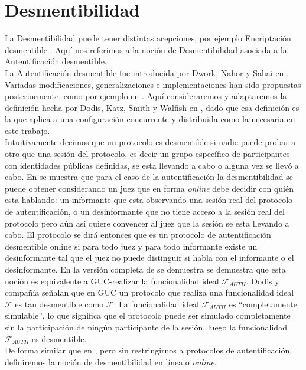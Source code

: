 \chapter{Desmentibilidad}
La Desmentibilidad puede tener distintas acepciones, por ejemplo Encriptación
desmentible \cite{CanettiEtAl97}. Aquí nos referimos a la noción de Desmentibilidad asociada
a la Autentificación desmentible.\\
La Autentificación desmentible fue introducida por Dwork, Nahor y Sahai en \cite{DwoNaoSah04}.
Variadas modificaciones, generalizaciones e implementaciones han sido propuestas posteriormente,
como por ejemplo en \cite{journals/joc/RaimondoG09}. Aquí consideraremos y adaptaremos la definición
hecha por Dodis, Katz, Smith y Walfish en \cite{conf/tcc/DodisKSW09}, dado que esa definición
es la que aplica a una configuración concurrente y distribuida como la necesaria en este trabajo.\\
Intuitivamente decimos que un protocolo es desmentible si nadie puede probar a otro que una sesión
del protocolo, es decir un grupo específico de participantes con identidades públicas definidas,
se esta llevando a cabo o alguna vez se llevó a cabo. En \cite{conf/tcc/DodisKSW09} se muestra que
para el caso de la autentificación la desmentibilidad se puede obtener considerando un juez que
en forma \textit{online} debe decidir con quién esta hablando: un informante que esta observando
una sesión real del protocolo de autentificación, o un desinformante que no tiene acceso a la sesión
real del protocolo pero aún así quiere convencer al juez que la sesión se esta llevando a cabo.
El protocolo se dirá entonces que es un protocolo de autentificación desmentible online si
para todo juez y para todo informante existe un desinformante tal
que el juez no puede distinguir
si habla con el informante o el desinformante. En la versión completa de \cite{conf/tcc/DodisKSW09}
se demuestra se demuestra que esta noción es equivalente a GUC-realizar la funcionalidad ideal
$\mathcal{F}_{AUTH}$. Dodis y compañía señalan que en GUC un protocolo que realiza una funcionalidad
ideal $\mathcal{F}$ es tan desmentible como $\mathcal{F}$. La funcionalidad ideal $\mathcal{F}_{AUTH}$
es ``completamente simulable'', lo que significa que el protocolo puede ser simulado completamente sin
la participación de ningún participante de la sesión, luego la funcionalidad $\mathcal{F}_{AUTH}$
es desmentible.\\
De forma similar que en \cite{conf/tcc/DodisKSW09}, pero sin restringirnos a protocolos de autentificación,
definiremos la noción de desmentibilidad en línea o \textit{online}.

